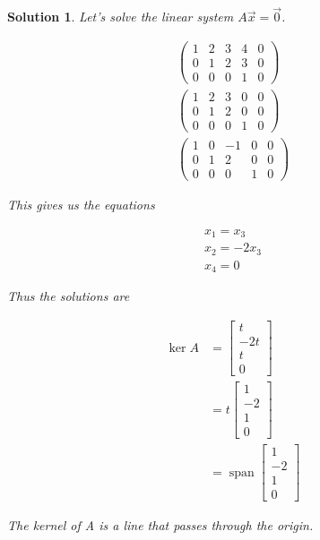 \documentclass{article}
\newtheorem*{solution}{Solution}
\DeclareMathOperator{\Span}{span}
\begin{document}
\begin{solution}
Let's solve the linear system $A\vec{x} = \vec{0}$.

\begin{align*}
\left( \begin{array}{cccc|c}1 & 2 & 3 & 4 & 0 \\ 0 & 1 & 2 & 3 & 0 \\ 0 & 0 & 0 & 1 & 0 \end{array} \right) \\
\left( \begin{array}{cccc|c}1 & 2 & 3 & 0 & 0 \\ 0 & 1 & 2 & 0 & 0 \\ 0 & 0 & 0 & 1 & 0 \end{array} \right) \\
\left( \begin{array}{cccc|c}1 & 0 & -1 & 0 & 0 \\ 0 & 1 & 2 & 0 & 0 \\ 0 & 0 & 0 & 1 & 0 \end{array} \right)
\end{align*}

This gives us the equations

\begin{align*}
x_{1} = x_{3} \\
x_{2} = -2x_{3} \\
x_{4} = 0
\end{align*}

Thus the solutions are

\begin{align*}
\ker A &= \begin{bmatrix}
t \\ -2t \\ t \\ 0
\end{bmatrix} \\
&= t \begin{bmatrix}
1 \\ -2 \\ 1 \\ 0
\end{bmatrix} \\
&= \Span \begin{bmatrix}
1 \\ -2 \\ 1 \\ 0
\end{bmatrix}
\end{align*}

The kernel of A is a line that passes through the origin.

\end{solution}
\end{document}
